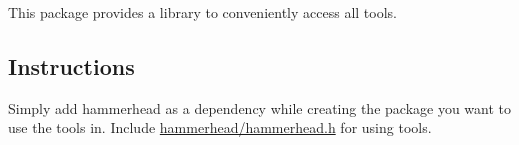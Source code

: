 This package provides a library to conveniently access all tools.

\subsection*{Instructions}

Simply add {\ttfamily hammerhead} as a dependency while creating the package you want to use the tools in. Include {\ttfamily \hyperlink{hammerhead_8h}{hammerhead/hammerhead.\+h}} for using tools. 
